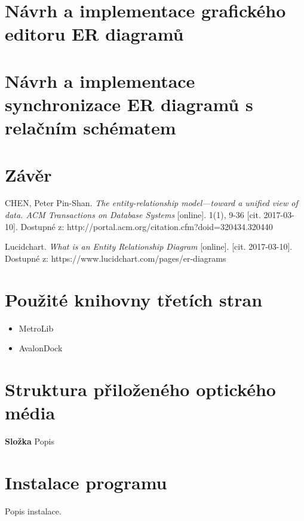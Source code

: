 \documentclass[czech,bachelor,public,dept460,male,oneside]{diploma}
\begin{document}
\newpage
\section{Návrh a implementace grafického editoru ER diagramů}

\newpage
\section{Návrh a implementace synchronizace ER diagramů s relačním schématem}

\newpage
\section{Závěr}

\newpage

\begin{thebibliography}{99}
	 CHEN, Peter Pin-Shan. \textit{The entity-relationship model---toward a unified view of data. ACM Transactions on Database Systems} [online]. 1(1), 9-36 [cit. 2017-03-10]. Dostupné z: http://portal.acm.org/citation.cfm?doid=320434.320440
	
	Lucidchart. \textit{What is an Entity Relationship Diagram} [online]. [cit. 2017-03-10]. Dostupné z: https://www.lucidchart.com/pages/er-diagrams
\end{thebibliography}


\appendix
\section{Použité knihovny třetích stran}
\begin{itemize}
	\item MetroLib
	\item AvalonDock
\end{itemize}

\section{Struktura přiloženého optického média}
\textbf{Složka} Popis

\section{Instalace programu}
Popis instalace.
\end{document}
